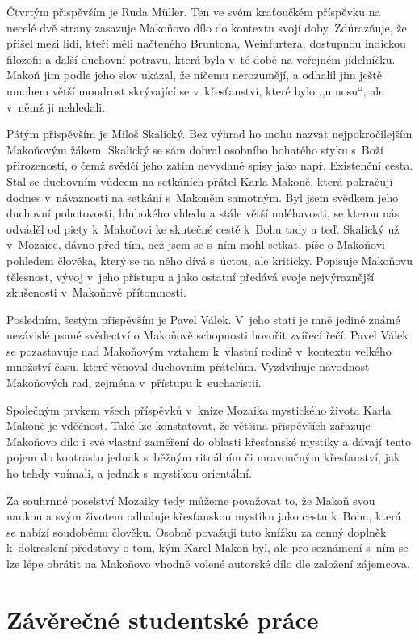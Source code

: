 Čtvrtým přispěvším je Ruda Müller. Ten ve svém kraťoučkém příspěvku na necelé
dvě strany zasazuje Makoňovo dílo do kontextu svojí doby. Zdůrazňuje, že přišel
mezi lidi, kteří měli načteného Bruntona, Weinfurtera, dostupnou indickou
filozofii a další duchovní potravu, která byla v~té době na veřejném jídelníčku.
Makoň jim podle jeho slov ukázal, že ničemu nerozumějí, a odhalil jim ještě
mnohem větší moudrost skrývající se v~křesťanství, které bylo ,,u nosu``, ale
v~němž ji nehledali.

Pátým přispěvším je Miloš Skalický. Bez výhrad ho mohu nazvat nejpokročilejším
Makoňovým žákem. Skalický se sám dobral osobního bohatého styku s~Boží
přirozeností, o čemž svědčí jeho zatím nevydané spisy jako např. Existenční
cesta. Stal se duchovním vůdcem na setkáních přátel Karla Makoně, která
pokračují dodnes v~návaznosti na setkání s~Makoněm samotným. Byl jsem svědkem
jeho duchovní pohotovosti, hlubokého vhledu a stále větší naléhavosti, se kterou
nás odváděl od piety k~Makoňovi ke skutečné cestě k~Bohu tady a teď. Skalický už
v~Mozaice, dávno před tím, než jsem se s~ním mohl setkat, píše o Makoňovi
pohledem člověka, který se na něho dívá s~úctou, ale kriticky. Popisuje Makoňovu
tělesnost, vývoj v~jeho přístupu a jako ostatní předává svoje nejvýraznější
zkušenosti v~Makoňově přítomnosti.

Posledním, šestým přispěvším je Pavel Válek. V~jeho stati je mně jediné známé
nezávislé psané svědectví o Makoňově schopnosti hovořit zvířecí řečí. Pavel
Válek se pozastavuje nad Makoňovým vztahem k~vlastní rodině v~kontextu velkého
množství času, které věnoval duchovním přátelům. Vyzdvihuje návodnost Makoňových
rad, zejména v~přístupu k~eucharistii.

Společným prvkem všech příspěvků v~knize Mozaika mystického života Karla Makoně
je vděčnost. Také lze konstatovat, že většina přispěvších zařazuje Makoňovo dílo
i své vlastní zaměření do oblasti křesťanské mystiky a dávají tento pojem do
kontrastu jednak s~běžným rituálním či mravoučným křesťanství, jak ho tehdy
vnímali, a jednak s~mystikou orientální.

Za souhrnné poselství Mozaiky tedy můžeme považovat to, že Makoň svou naukou a
svým životem odhaluje křesťanskou mystiku jako cestu k~Bohu, která se nabízí
soudobému člověku. Osobně považuji tuto knížku za cenný doplněk k~dokreslení
představy o tom, kým Karel Makoň byl, ale pro seznámení s~ním se lze lépe
obrátit na Makoňovo vhodně volené autorské dílo dle založení zájemcova.

\section{Závěrečné studentské práce}

